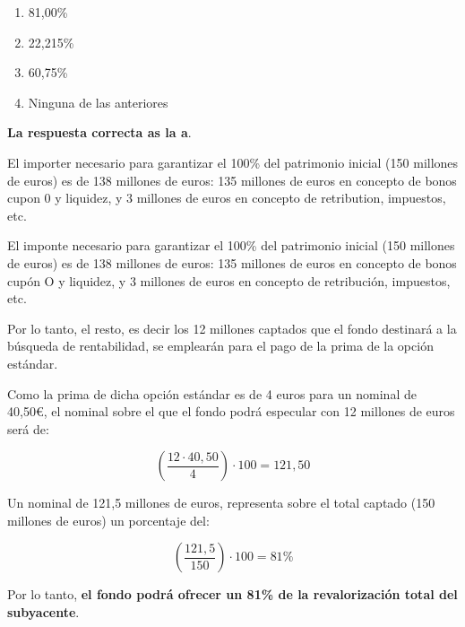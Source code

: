 \documentclass[
  letterpaper,
  DIV=11,
  numbers=noendperiod]{scrreprt}
\begin{document}
\begin{enumerate}
\def\labelenumi{\alph{enumi})}
\item
  81,00\%
\item
  22,215\%
\item
  60,75\%
\item
  Ninguna de las anteriores
\end{enumerate}

\begin{tcolorbox}[enhanced jigsaw, left=2mm, opacityback=0, colback=white, breakable, arc=.35mm, bottomrule=.15mm, rightrule=.15mm, toprule=.15mm, leftrule=.75mm, colframe=quarto-callout-tip-color-frame]
\begin{minipage}[t]{5.5mm}
\textcolor{quarto-callout-tip-color}{\faLightbulb}
\end{minipage}%
\begin{minipage}[t]{\textwidth - 5.5mm}

\textbf{La respuesta correcta as la a}.

El importer necesario para garantizar el 100\% del patrimonio inicial
(150 millones de euros) es de 138 millones de euros: 135 millones de
euros en concepto de bonos cupon 0 y liquidez, y 3 millones de euros en
concepto de retribution, impuestos, etc.

El imponte necesario para garantizar el 100\% del patrimonio inicial
(150 millones de euros) es de 138 millones de euros: 135 millones de
euros en concepto de bonos cupón O y liquidez, y 3 millones de euros en
concepto de retribución, impuestos, etc.

Por lo tanto, el resto, es decir los 12 millones captados que el fondo
destinará a la búsqueda de rentabilidad, se emplearán para el pago de la
prima de la opción estándar.

Como la prima de dicha opción estándar es de 4 euros para un nominal de
40,50€, el nominal sobre el que el fondo podrá especular con 12 millones
de euros será de:

\[\left(\frac{12\cdot40,50}{4}\right)\cdot100=121,50\]

Un nominal de 121,5 millones de euros, representa sobre el total captado
(150 millones de euros) un porcentaje del:

\[\left(\frac{121,5}{150}\right)\cdot100=81\%\]

Por lo tanto, \textbf{el fondo podrá ofrecer un 81\% de la
revalorización total del subyacente}.

\end{minipage}%
\end{tcolorbox}
\end{document}
